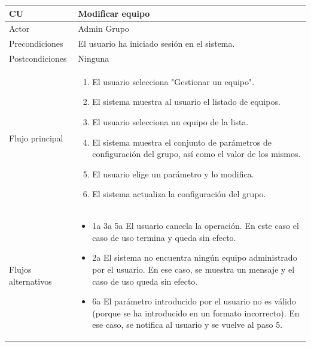 \documentclass[twoside]{report}
\newcommand\addrow[2]{#1 &#2\\ }
\newcommand\addheading[2]{#1 &#2\\ \hline}
\newcommand\tabularhead{\begin{tabular}{lp{0.7\textwidth}}
\hline
}
\newcommand\addmulrow[2]{ \begin{minipage}[t][][t]{2.5cm}#1\end{minipage}%
   &\begin{minipage}[t][][t]{8cm}
    \begin{enumerate} #2   \end{enumerate}
    \end{minipage}\\ }
\newenvironment{usecase}{\tabularhead}
{\hline\end{tabular}}
\begin{document}
\begin{usecase}
  \addheading{\textbf{CU\arabic{usecase}}}{Modificar equipo} 
  \addrow{Actor}{Admin Grupo}
  \addrow{Precondiciones}{El usuario ha iniciado sesión en el sistema.}
  \addrow{Postcondiciones}{Ninguna}
  \addmulrow{Flujo principal}{
  		\item El usuario selecciona "Gestionar un equipo". %
        \item El sistema muestra al usuario el listado de equipos. %
        \item El usuario selecciona un equipo de la lista. %
        \item El sistema muestra el conjunto de parámetros de configuración del grupo, así como el valor de los mismos. %
        \item El usuario elige un parámetro y lo modifica. %
        \item El sistema actualiza la configuración del grupo. %
  }
  \addrow{Flujos alternativos}{
  		\begin{itemize}
  		\item 1a 3a 5a El usuario cancela la operación. En este caso el caso de uso termina y queda sin efecto.
  		\item 2a El sistema no encuentra ningún equipo administrado por el usuario. En ese caso, se muestra un mensaje y el caso de uso queda sin efecto.
  		\item 6a El parámetro introducido por el usuario no es válido (porque se ha introducido en un formato incorrecto). En ese caso, se notifica al usuario y se vuelve al paso 5.
  		\end{itemize}
  }
\end{usecase}\\
\end{document}
